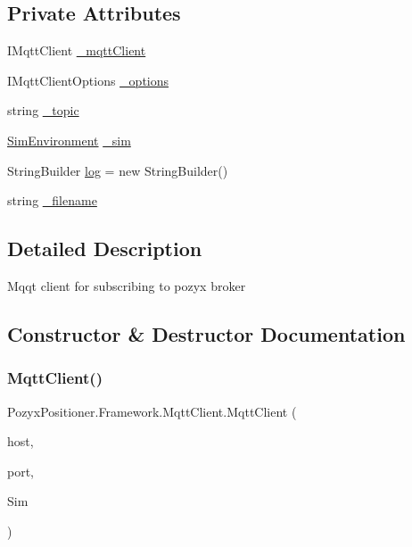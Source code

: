 \subsection*{Private Attributes}
\begin{DoxyCompactItemize}
\item 
I\+Mqtt\+Client \hyperlink{class_pozyx_positioner_1_1_framework_1_1_mqtt_client_a3bef7957deec9a68cf853c17555a4f85}{\+\_\+mqtt\+Client}
\item 
I\+Mqtt\+Client\+Options \hyperlink{class_pozyx_positioner_1_1_framework_1_1_mqtt_client_abb53312377599059079ab76f8299599e}{\+\_\+options}
\item 
string \hyperlink{class_pozyx_positioner_1_1_framework_1_1_mqtt_client_a6ea2bbc30c60ba16cd972acfb64beea3}{\+\_\+topic}
\item 
\hyperlink{class_pozyx_positioner_1_1_framework_1_1_sim_environment}{Sim\+Environment} \hyperlink{class_pozyx_positioner_1_1_framework_1_1_mqtt_client_a65faa3911fc07423829583320c96ab59}{\+\_\+sim}
\item 
String\+Builder \hyperlink{class_pozyx_positioner_1_1_framework_1_1_mqtt_client_a7dbee0133f3ec032ceffa37c73525aaa}{log} = new String\+Builder()
\item 
string \hyperlink{class_pozyx_positioner_1_1_framework_1_1_mqtt_client_affc988c8046e844a8814a33dcc7ae611}{\+\_\+filename}
\end{DoxyCompactItemize}


\subsection{Detailed Description}
Mqqt client for subscribing to pozyx broker 



\subsection{Constructor \& Destructor Documentation}
\mbox{\label{class_pozyx_positioner_1_1_framework_1_1_mqtt_client_a4e2ab3ac03e686e3b85fe50d1a02feb8}} 
\subsubsection{\texorpdfstring{Mqtt\+Client()}{MqttClient()}\hspace{0.1cm}{\footnotesize\ttfamily [1/2]}}
{\footnotesize\ttfamily Pozyx\+Positioner.\+Framework.\+Mqtt\+Client.\+Mqtt\+Client (\begin{DoxyParamCaption}\item[{string}]{host,  }\item[{int}]{port,  }\item[{\hyperlink{class_pozyx_positioner_1_1_framework_1_1_sim_environment}{Sim\+Environment}}]{Sim }\end{DoxyParamCaption})}



